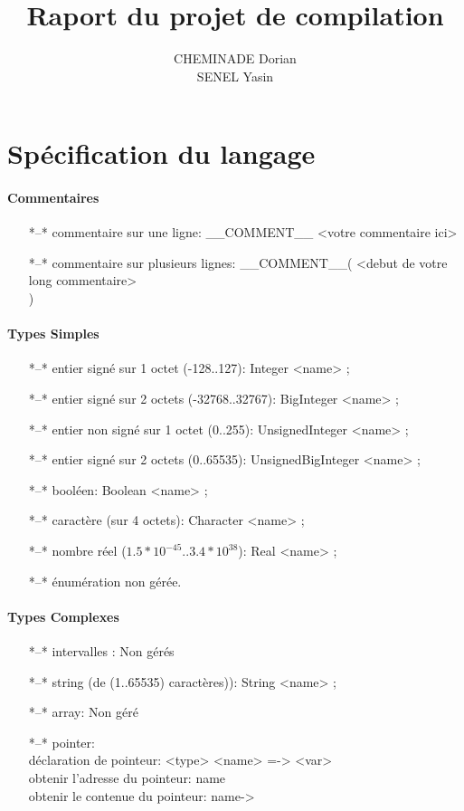 \documentclass[10pt,a4paper]{report}
\author{CHEMINADE Dorian \\ SENEL Yasin}
\title{Raport du projet de compilation}
\begin{document}
\maketitle

\section{Spécification du langage}


\paragraph{Commentaires}
\begin{itemize}
\item[*--*]commentaire sur une ligne: \_\_COMMENT\_\_ <votre commentaire ici>
\item[*--*]commentaire sur plusieurs lignes: \_\_COMMENT\_\_( <debut de votre long commentaire>\\<fin de votre long commentaire> )
\end{itemize}

\paragraph{Types Simples}
\begin{itemize}
\item[*--*]entier signé sur 1 octet (-128..127): Integer <name> ;
\item[*--*]entier signé sur 2 octets (-32768..32767): BigInteger <name> ;
\item[*--*]entier non signé sur 1 octet (0..255): UnsignedInteger <name> ;
\item[*--*]entier signé sur 2 octets (0..65535): UnsignedBigInteger <name> ;
\item[*--*]booléen: Boolean <name> ;
\item[*--*]caractère (sur 4 octets): Character <name> ;
\item[*--*]nombre réel ($1.5*10^{-45}..3.4*10^{38}$): Real <name> ;
\item[*--*]énumération non gérée.
	
\end{itemize}

\paragraph{Types Complexes}
\begin{itemize}
\item[*--*]intervalles : Non gérés
\item[*--*]string (de (1..65535) caractères)): String <name> ;
\item[*--*]array: Non géré
\item[*--*]pointer: 
	\\déclaration de pointeur: <type> <name> =-> <var>
	\\obtenir l'adresse du pointeur: name
	\\obtenir le contenue du pointeur: name->
\end{itemize}
\end{document}
